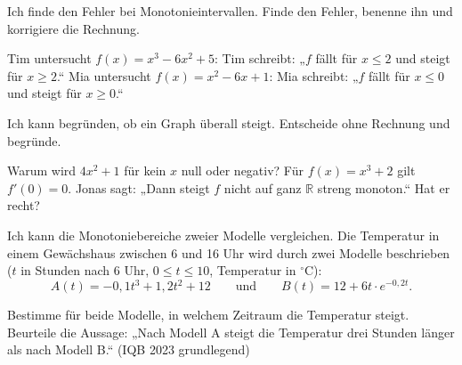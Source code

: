 \begin{aufgabe}{Ich finde den Fehler bei Monotonieintervallen.}
Finde den Fehler, benenne ihn und korrigiere die Rechnung.
\begin{teile}
\teil Tim untersucht $f(x) = x^3 - 6x^2 + 5$:
Tim schreibt: „$f$ fällt für $x \le 2$ und steigt für $x \ge 2$.“
\teil Mia untersucht $f(x) = x^2 - 6x + 1$:
Mia schreibt: „$f$ fällt für $x \le 0$ und steigt für $x \ge 0$.“
\end{teile}
\end{aufgabe}

\begin{aufgabe}{Ich kann begründen, ob ein Graph überall steigt.}
Entscheide ohne Rechnung und begründe.
\begin{teile}
\teil Warum wird $4x^2 + 1$ für kein $x$ null oder negativ?
\teil Für $f(x) = x^3 + 2$ gilt $f'(0) = 0$. Jonas sagt: „Dann steigt $f$ nicht auf ganz $\mathbb{R}$ streng monoton.“ Hat er recht?
\end{teile}
\end{aufgabe}

\begin{aufgabe}{Ich kann die Monotoniebereiche zweier Modelle vergleichen.}
Die Temperatur in einem Gewächshaus zwischen 6 und 16 Uhr wird durch zwei Modelle beschrieben ($t$ in Stunden nach 6 Uhr, $0 \le t \le 10$, Temperatur in $^\circ$C):
\[ A(t) = -0{,}1t^3 + 1{,}2t^2 + 12 \qquad\text{und}\qquad B(t) = 12 + 6t\cdot e^{-0{,}2t}. \]
\begin{teile}
\teil Bestimme für beide Modelle, in welchem Zeitraum die Temperatur steigt.
\teil Beurteile die Aussage: „Nach Modell A steigt die Temperatur drei Stunden länger als nach Modell B.“ (IQB 2023 grundlegend)
\end{teile}
\end{aufgabe}
